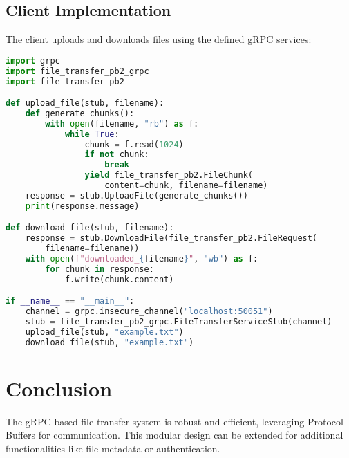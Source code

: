 \documentclass{article}
\begin{document}
\subsection*{Client Implementation}
The client uploads and downloads files using the defined gRPC services:
\begin{lstlisting}[language=python, caption={Client Implementation}, frame=single]
import grpc
import file_transfer_pb2_grpc
import file_transfer_pb2

def upload_file(stub, filename):
    def generate_chunks():
        with open(filename, "rb") as f:
            while True:
                chunk = f.read(1024)
                if not chunk:
                    break
                yield file_transfer_pb2.FileChunk(
                    content=chunk, filename=filename)
    response = stub.UploadFile(generate_chunks())
    print(response.message)

def download_file(stub, filename):
    response = stub.DownloadFile(file_transfer_pb2.FileRequest(
        filename=filename))
    with open(f"downloaded_{filename}", "wb") as f:
        for chunk in response:
            f.write(chunk.content)

if __name__ == "__main__":
    channel = grpc.insecure_channel("localhost:50051")
    stub = file_transfer_pb2_grpc.FileTransferServiceStub(channel)
    upload_file(stub, "example.txt")
    download_file(stub, "example.txt")
\end{lstlisting}

\section*{Conclusion}
The gRPC-based file transfer system is robust and efficient, leveraging Protocol Buffers for communication. This modular design can be extended for additional functionalities like file metadata or authentication.
\end{document}
